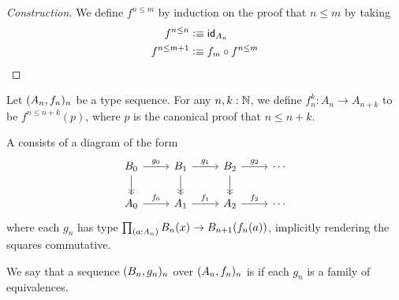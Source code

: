 \begin{proof}[Construction]
We define $f^{n\leq m}$ by induction on the proof that $n\leq m$ by taking
\begin{align*}
f^{n\leq n} & \defeq \idfunc[A_n] \\
f^{n\leq m+1} & \defeq f_m\circ f^{n\leq m} \qedhere
\end{align*}
\end{proof}

\begin{defn}
Let $\sequence{A}{f}$ be a type sequence. For any $n,k:\nat$, we define
$f_n^k:A_n\to A_{n+k}$ to be $f^{n\leq n+k}(p)$, where $p$ is the canonical proof that $n\leq n+k$.
\end{defn}

\begin{defn}
A  consists of a diagram of the form
\begin{equation*}
\begin{tikzcd}
B_{0} \arrow[r,"g_0"] \arrow[d,->>] & B_{1} \arrow[r,"g_1"] \arrow[d,->>] & B_{2} \arrow[r,"g_2"] \arrow[d,->>] & \cdots \\
A_0 \arrow[r,"f_0"] & A_1 \arrow[r,"f_1"] & A_2 \arrow[r,"f_2"] & \cdots
\end{tikzcd}
\end{equation*}
where each $g_n$ has type $\prd{a:A_n} B_n(x)\to B_{n+1}(f_n(a))$, implicitly rendering the
squares commutative.

We say that a sequence $\sequence{B}{g}$ over $\sequence{A}{f}$ is  if each $g_n$ is a family of equivalences.
\end{defn}

